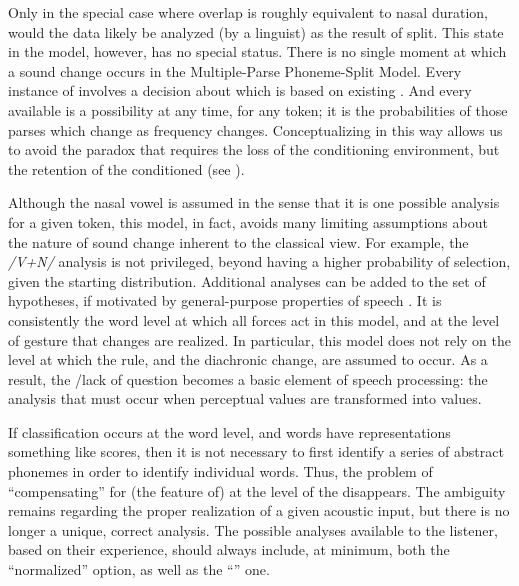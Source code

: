 Only in the special
case where overlap is roughly equivalent to nasal duration, would
the data likely be analyzed (by a linguist) as the result of 
split. This state in the model, however, has no special status. There is no single moment
at which a sound change occurs in the Multiple-Parse Phoneme-Split
Model. Every instance of  involves a decision about 
which is based on existing . And every available
 is a possibility at any time, for any token; it is the probabilities
of those parses which change as frequency changes. Conceptualizing  in this way allows us to avoid the 
paradox that requires the loss of the conditioning environment, but
the retention of the conditioned  (see ). 

Although the nasal vowel 
is assumed in the sense that it is one possible analysis for a given
token, this model, in fact, avoids many limiting assumptions about
the nature of sound change inherent to the classical view. For example,
the \emph{/V+N/} analysis is not privileged, beyond having a higher
probability of selection, given the starting distribution. Additional
analyses can be added to the set of  hypotheses, if motivated
by general-purpose properties of speech . It is consistently
the word level at which all forces act in this model, and at the level
of  gesture that changes are realized. In particular,
this model does not rely on the  level at which the 
rule, and the diachronic change, are assumed to occur. As a result,
the /lack of  question becomes a basic element
of speech processing: the analysis that must occur when perceptual
values are transformed into  values. 

If classification occurs at the word level, and words have 
representations something like  scores, then it is not necessary
to first identify a series of abstract phonemes in order to identify
individual words. Thus, the problem of “compensating” for (the
feature of)  at the level of the  disappears. The
ambiguity remains regarding the proper  realization of
a given acoustic input, but there is no longer a unique, correct 
analysis. The possible analyses available to the listener, based on
their  experience, should always include, at minimum, both
the “normalized” option, as well as the “”
one.

